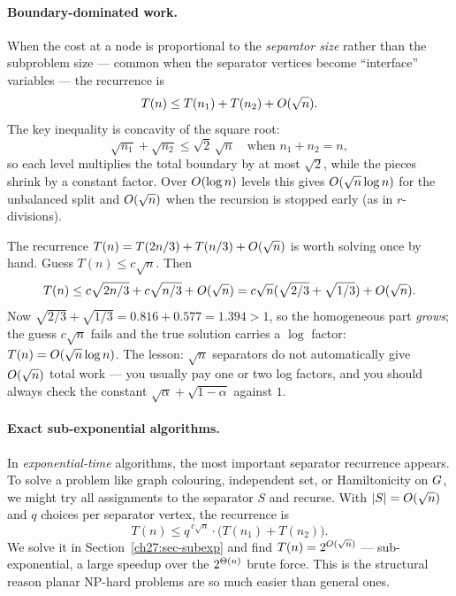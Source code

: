 \paragraph{Boundary-dominated work.} When the cost at a node is proportional to the \emph{separator size} rather than the subproblem size --- common when the separator vertices become ``interface'' variables --- the recurrence is
\[
  T(n) \le T(n_1)+T(n_2)+O(\sqrt n).
\]
The key inequality is concavity of the square root:
\[
  \sqrt{n_1}+\sqrt{n_2}\le \sqrt2\,\sqrt n \quad\text{when } n_1+n_2=n,
\]
so each level multiplies the total boundary by at most $\sqrt2$, while the pieces shrink by a constant factor. Over $O(\log n)$ levels this gives $O(\sqrt n\log n)$ for the unbalanced split and $O(\sqrt n)$ when the recursion is stopped early (as in $r$-divisions).

\begin{whybox}
The recurrence $T(n)=T(2n/3)+T(n/3)+O(\sqrt n)$ is worth solving once by hand. Guess $T(n)\le c\sqrt n$. Then
\[
  T(n) \le c\sqrt{2n/3} + c\sqrt{n/3} + O(\sqrt n) = c\sqrt n(\sqrt{2/3} + \sqrt{1/3}) + O(\sqrt n).
\] Now $\sqrt{2/3}+\sqrt{1/3}=0.816+0.577=1.394>1$, so the homogeneous part \emph{grows}; the guess $c\sqrt n$ fails and the true solution carries a $\log$ factor: $T(n)=O(\sqrt n\log n)$. The lesson: $\sqrt n$ separators do not automatically give $O(\sqrt n)$ total work --- you usually pay one or two log factors, and you should always check the constant $\sqrt{\alpha}+\sqrt{1-\alpha}$ against $1$.
\end{whybox}

\paragraph{Exact sub-exponential algorithms.} In \emph{exponential-time} algorithms, the most important separator recurrence appears. To solve a problem like graph colouring, independent set, or Hamiltonicity on $G$, we might try all assignments to the separator $S$ and recurse. With $\lvert S\rvert=O(\sqrt n)$ and $q$ choices per separator vertex, the recurrence is
\[
  T(n)\le q^{\,c\sqrt n}\cdot\big(T(n_1)+T(n_2)\big).
\]
We solve it in Section~\ref{ch27:sec-subexp} and find $T(n)=2^{O(\sqrt n)}$ --- sub-exponential, a large speedup over the $2^{\Theta(n)}$ brute force. This is the structural reason planar NP-hard problems are so much easier than general ones.


